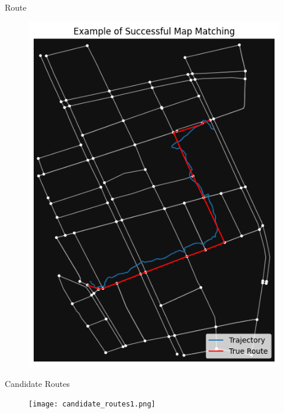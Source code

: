 \documentclass[aspectratio=169, bigfiles]{beamer}
\begin{document}
\begin{frame}{Route}
\vspace{-.1cm}
       \begin{figure}
        \centering
        \includegraphics[scale=.22]{trueroute.png}
    \end{figure} 
\end{frame}

\begin{frame}{Candidate Routes}
    \begin{figure}
        \centering
        \texttt{[image: candidate\_routes1.png]}
    \end{figure}
\end{frame}

\end{document}
